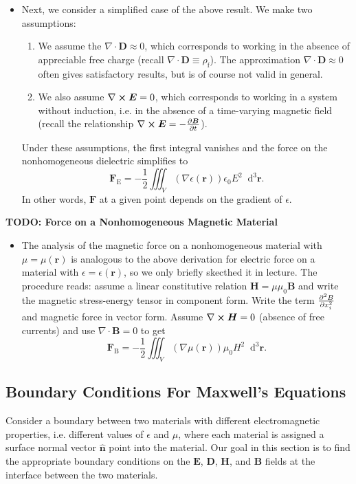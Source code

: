 \documentclass[11pt, a4paper]{article}
\newcommand{\diff}{\mathop{}\!\mathrm{d}} %
\newcommand{\dr}{\diff^{3} \r}  %
\renewcommand{\vec}[1]{\bm{#1}} %
\newcommand{\uvec}[1]{\hat{\vec{#1}}} %
\renewcommand{\r}{\vec{r}}
\newcommand{\E}{\vec{E}} %
\newcommand{\D}{\vec{D}}  %
\newcommand{\B}{\vec{B}} %
\renewcommand{\H}{\vec{H}}  %
\newcommand{\e}{\epsilon}
\newcommand{\ee}{\epsilon_{0}}  %
\newcommand{\mm}{\mu_{0}}  %
\renewcommand{\div}{\nabla \cdot}
\renewcommand{\curl}{\nabla \cross}
\renewcommand{\grad}{\nabla}
\begin{document}
\begin{itemize}
	\item Next, we consider a simplified case of the above result. We make two assumptions:
    \begin{enumerate}
        \item We assume the $ \div \D \approx 0 $, which corresponds to working in the absence of appreciable free charge (recall $ \div \D \equiv \rho_{\text{f}} $). The approximation $ \div \D \approx 0 $ often gives satisfactory results, but is of course not valid in general.
        
        \item We also assume $ \curl \E = 0 $, which corresponds to working in a system without induction, i.e. in the absence of a time-varying magnetic field (recall the relationship $ \curl \E = - \pdv{\B}{t} $).
    \end{enumerate}
    Under these assumptions, the first integral vanishes and the force on the nonhomogeneous dielectric simplifies to
	\begin{equation*}
		\vec{F}_{\text{E}} = - \frac{1}{2}\iiint_{V}(\grad \e(\r))\ee E^{2}\dr.
	\end{equation*}
	In other words, $ \vec{F} $ at a given point depends on the gradient of $ \e $. 
	
	
\end{itemize}

\textbf{TODO: Force on a Nonhomogeneous Magnetic Material}
\begin{itemize}
    \item The analysis of the magnetic force on a nonhomogeneous material with $ \mu = \mu(\r) $ is analogous to the above derivation for electric force on a material with $ \e = \e(\r) $, so we only briefly skecthed it in lecture. The procedure reads: assume a linear constitutive relation $ \H = \mu \mm \B $ and write the magnetic stress-energy tensor in component form. Write the term $ \pdv[2]{B}{x_{i}} $ and magnetic force in vector form. Assume $ \curl \H = 0 $ (absence of free currents) and use $ \div \B = 0 $ to get
	\begin{equation*}
		\vec{F}_{\text{B}} = -\frac{1}{2}\iiint_{V} (\grad \mu(\r))\mm H^{2}\dr.
	\end{equation*}
\end{itemize}


\subsection{Boundary Conditions For Maxwell's Equations}
Consider a boundary between two materials with different electromagnetic properties, i.e. different values of $ \epsilon $ and $ \mu $, where each material is assigned a surface normal vector $ \uvec{n} $ point into the material. Our goal in this section is to find the appropriate boundary conditions on the $ \E $, $ \D $, $ \H $, and $ \B $ fields at the interface between the two materials.
\end{document}
